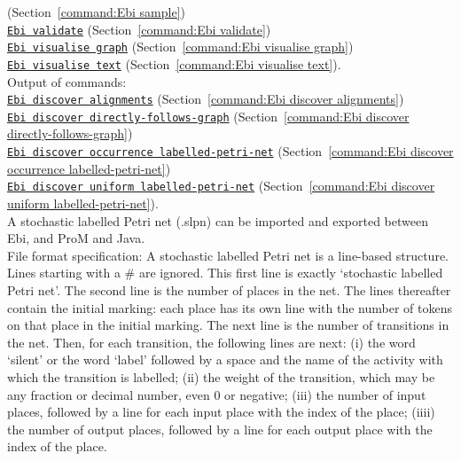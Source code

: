 {(Section~\ref{command:Ebi sample})\\\null\qquad\hyperref[command:Ebi validate]{\texttt{Ebi validate}} (Section~\ref{command:Ebi validate})\\\null\qquad\hyperref[command:Ebi visualise graph]{\texttt{Ebi visualise graph}} (Section~\ref{command:Ebi visualise graph})\\\null\qquad\hyperref[command:Ebi visualise text]{\texttt{Ebi visualise text}} (Section~\ref{command:Ebi visualise text}).
\\Output of commands: \\\null\qquad\hyperref[command:Ebi discover alignments]{\texttt{Ebi discover alignments}} (Section~\ref{command:Ebi discover alignments})\\\null\qquad\hyperref[command:Ebi discover directly-follows-graph]{\texttt{Ebi discover directly-follows-graph}} (Section~\ref{command:Ebi discover directly-follows-graph})\\\null\qquad\hyperref[command:Ebi discover occurrence labelled-petri-net]{\texttt{Ebi discover occurrence labelled-petri-net}} (Section~\ref{command:Ebi discover occurrence labelled-petri-net})\\\null\qquad\hyperref[command:Ebi discover uniform labelled-petri-net]{\texttt{Ebi discover uniform labelled-petri-net}} (Section~\ref{command:Ebi discover uniform labelled-petri-net}).
\\A stochastic labelled Petri net (.slpn) can be imported and exported between Ebi, and ProM and Java.
\\File format specification:
A stochastic labelled Petri net is a line-based structure. Lines starting with a \# are ignored.
    This first line is exactly `stochastic labelled Petri net'.
    The second line is the number of places in the net.
    The lines thereafter contain the initial marking: each place has its own line with the number of tokens on that place in the initial marking.
    The next line is the number of transitions in the net.
    Then, for each transition, the following lines are next: 
    (i) the word `silent' or the word `label' followed by a space and the name of the activity with which the transition is labelled;
    (ii) the weight of the transition, which may be any fraction or decimal number, even 0 or negative;
    (iii) the number of input places, followed by a line for each input place with the index of the place;
    (iiii) the number of output places, followed by a line for each output place with the index of the place.
    
}
